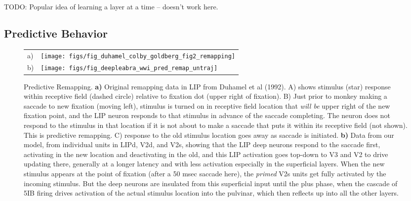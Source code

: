 \documentclass[11pt,twoside]{article}
\newif\myifpdf
\begin{document}
TODO: Popular idea of learning a layer at a time -- doesn't work here.

\subsection{Predictive Behavior}

\begin{figure}
  \begin{center}
    \begin{tabular}{ll}
      \parbox[b]{.1em}{a) \vspace*{1.4in}} &
      \texttt{[image: figs/fig\_duhamel\_colby\_goldberg\_fig2\_remapping]} \\
      \parbox[b]{.1em}{b) \vspace*{1.4in}} &
      \texttt{[image: figs/fig\_deepleabra\_wwi\_pred\_remap\_untraj]}
    \end{tabular}
  \end{center}
  \caption{Predictive Remapping.  {\bf a)} Original remapping data in LIP from Duhamel et al (1992).  A) shows stimulus (star) response within receptive field (dashed circle) relative to fixation dot (upper right of fixation).  B) Just prior to monkey making a saccade to new fixation (moving left), stimulus is turned on in receptive field location that {\em will be} upper right of the new fixation point, and the LIP neuron responds to that stimulus in advance of the saccade completing.  The neuron does not respond to the stimulus in that location if it is not about to make a saccade that puts it within its receptive field (not shown).  This is predictive remapping.  C) response to the old stimulus location goes away as saccade is initiated.  {\bf b)} Data from our model, from individual units in LIPd, V2d, and V2s, showing that the LIP deep neurons respond to the saccade first, activating in the new location and deactivating in the old, and this LIP activation goes top-down to V3 and V2 to drive updating there, generally at a longer latency and with less activation especially in the superficial layers.  When the new stimulus appears at the point of fixation (after a 50 msec saccade here), the {\em primed} V2s units get fully activated by the incoming stimulus.  But the deep neurons are insulated from this superficial input until the plus phase, when the cascade of 5IB firing drives activation of the actual stimulus location into the pulvinar, which then reflects up into all the other layers.}
  \label{fig.remap_units}
\end{figure}
\end{document}
